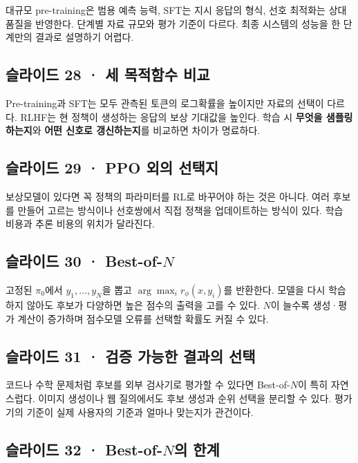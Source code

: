 \documentclass[11pt,a4paper]{article}
\begin{document}
대규모 pre-training은 범용 예측 능력, SFT는 지시 응답의 형식, 선호 최적화는 상대 품질을 반영한다. 단계별 자료 규모와 평가 기준이 다르다. 최종 시스템의 성능을 한 단계만의 결과로 설명하기 어렵다.\par

\subsection{슬라이드 28 · 세 목적함수 비교}

Pre-training과 SFT는 모두 관측된 토큰의 로그확률을 높이지만 자료의 선택이 다르다. RLHF는 현 정책이 생성하는 응답의 보상 기대값을 높인다. 학습 시 \textbf{무엇을 샘플링하는지}와 \textbf{어떤 신호로 갱신하는지}를 비교하면 차이가 명료하다.\par

\subsection{슬라이드 29 · PPO 외의 선택지}

보상모델이 있다면 꼭 정책의 파라미터를 RL로 바꾸어야 하는 것은 아니다. 여러 후보를 만들어 고르는 방식이나 선호쌍에서 직접 정책을 업데이트하는 방식이 있다. 학습 비용과 추론 비용의 위치가 달라진다.\par

\subsection{슬라이드 30 · Best-of-$N$}

고정된 $\pi_0$에서 $y_1,\ldots,y_N$을 뽑고 $\arg\max_i r_\phi(x,y_i)$를 반환한다. 모델을 다시 학습하지 않아도 후보가 다양하면 높은 점수의 출력을 고를 수 있다. $N$이 늘수록 생성·평가 계산이 증가하며 점수모델 오류를 선택할 확률도 커질 수 있다.\par

\subsection{슬라이드 31 · 검증 가능한 결과의 선택}

코드나 수학 문제처럼 후보를 외부 검사기로 평가할 수 있다면 Best-of-$N$이 특히 자연스럽다. 이미지 생성이나 웹 질의에서도 후보 생성과 순위 선택을 분리할 수 있다. 평가기의 기준이 실제 사용자의 기준과 얼마나 맞는지가 관건이다.\par

\subsection{슬라이드 32 · Best-of-$N$의 한계}
\end{document}
